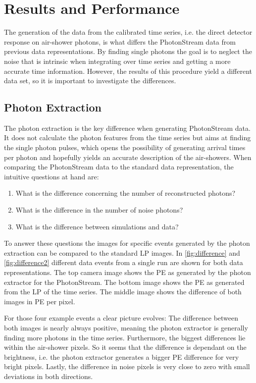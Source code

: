 \chapter{Results and Performance}
%
The generation of the data from the calibrated time series, i.e. the direct
detector response on air-shower photons, is what differs the PhotonStream data
from previous data representations. By finding single photons the goal is to
neglect the noise that is intrinsic when integrating over time series and
getting a more accurate time information. However, the results of this procedure
yield a different data set, so it is important to investigate the differences.

\section{Photon Extraction}
\label{sec:ph_ex}%
%
The photon extraction is the key difference when generating PhotonStream data.
It does not calculate the photon features from the time series but aims at
finding the single photon pulses, which opens the possibility of generating
arrival times per photon and hopefully yields an accurate description of the
air-showers. When comparing the PhotonStream data to the standard data
representation, the intuitive questions at hand are:
%
\begin{enumerate}
  \item What is the difference concerning the number of reconstructed photons?
  \item What is the difference in the number of noise photons?
  \item What is the difference between simulations and data?
\end{enumerate}
%
To answer these questions the images for specific events generated by the
photon extraction can be compared to the standard LP images. In
\autoref{fig:difference} and \autoref{fig:difference2} different data events
from a single run are shown for both data representations. The top camera image
shows the PE as generated by the photon extractor for the PhotonStream. The
bottom image shows the PE as generated from the LP of the time series. The
middle image shows the difference of both images in PE per pixel.

For those four example events a clear picture evolves: The difference between
both images is nearly always positive, meaning the photon extractor is
generally finding more photons in the time series. Furthermore, the biggest
differences lie within the air-shower pixels. So it seems that the difference
is dependant on the brightness, i.e. the photon extractor generates a bigger
PE difference for very bright pixels. Lastly, the difference in noise pixels is
very close to zero with small deviations in both directions.

